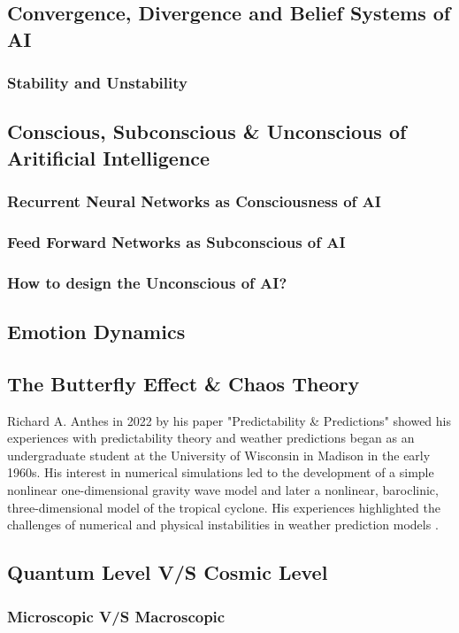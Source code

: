 \subsection{Convergence, Divergence and Belief Systems of AI}
\subsubsection{Stability and Unstability}
\subsection{Conscious, Subconscious \& Unconscious of Aritificial Intelligence}
\subsubsection{Recurrent Neural Networks as Consciousness of AI}
\subsubsection{Feed Forward Networks as Subconscious of AI}
\subsubsection{How to design the Unconscious of AI?}
\subsection{Emotion Dynamics}
\subsection{The Butterfly Effect \& Chaos Theory}
Richard A. Anthes in 2022 by his paper "Predictability \& Predictions" showed his experiences with predictability theory and weather predictions began as an undergraduate student at the University of Wisconsin in Madison in the early 1960s. His interest in numerical simulations led to the development of a simple nonlinear one-dimensional gravity wave model and later a nonlinear, baroclinic, three-dimensional model of the tropical cyclone. His experiences highlighted the challenges of numerical and physical instabilities in weather prediction models \cite{atmos13081292}. \cite{encyclopedia2030084}
\subsection{Quantum Level V/S Cosmic Level}
\subsubsection{Microscopic V/S Macroscopic}
